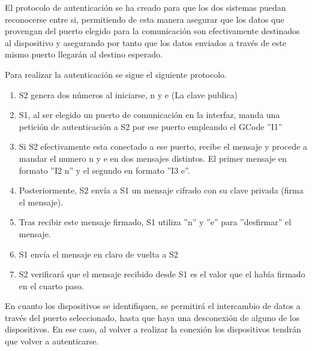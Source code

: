 El protocolo de autenticación se ha creado para que los dos sistemas puedan reconocerse entre si, permitiendo de esta manera asegurar que los datos que provengan del puerto elegido para la comunicación son efectivamente destinados al dispositivo y asegurando por tanto que los datos enviados a través de este mismo puerto llegarán al destino esperado.

Para realizar la autenticación se sigue el siguiente protocolo.

\begin{enumerate}
  \item \ac{S2} genera dos números al iniciarse, n y e (La clave publica)
  \item \ac{S1}, al ser elegido un puerto de comunicación en la interfaz, manda una petición de autenticación a \ac{S2} por ese puerto empleando el GCode ''I1''
  \item Si \ac{S2} efectivamente esta conectado a ese puerto, recibe el mensaje y procede a mandar el numero n y e en dos mensajes distintos. El primer mensaje en formato ''I2 n'' y el segundo en formato ''I3 e''.
  \item Posteriormente, \ac{S2} envía a \ac{S1} un mensaje cifrado con su clave privada (firma el mensaje).
  \item Tras recibir este mensaje firmado, \ac{S1} utiliza ''n'' y ''e'' para ''desfirmar'' el mensaje.
  \item \ac{S1} envía el mensaje en claro de vuelta a \ac{S2}
  \item \ac{S2} verificará que el mensaje recibido desde \ac{S1} es el valor que el había firmado en el cuarto paso.
\end{enumerate}

En cuanto los dispositivos se identifiquen, se permitirá el intercambio de datos a través del puerto seleccionado, hasta que haya una desconexión de alguno de los dispositivos. En ese caso, al volver a realizar la conexión los dispositivos tendrán que volver a autenticarse.